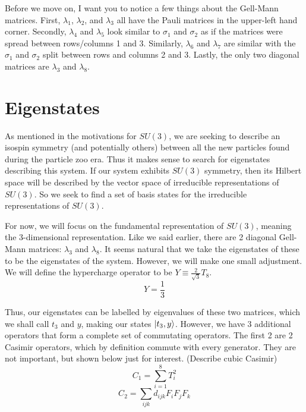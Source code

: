 \documentclass[12pt]{article}
\newcommand{\aside}[2]{#1}
\newcommand{\link}[2]{#1}
\newcommand{\todo}[1]{(#1)}
\begin{document}
Before we move on, I want you to notice a few things about the Gell-Mann matrices. First, $\lambda_1$, $\lambda_2$, and $\lambda_3$ all have the Pauli matrices in the upper-left hand corner. Secondly, $\lambda_4$ and $\lambda_5$ look similar to $\sigma_1$ and $\sigma_2$ as if the matrices were spread between rows/columns 1 and 3. Similarly, $\lambda_6$ and $\lambda_7$ are similar with the $\sigma_1$ and $\sigma_2$ split between rows and columns 2 and 3. Lastly, the only two diagonal matrices are $\lambda_3$ and $\lambda_8$. 

\section{Eigenstates}
As mentioned in the \link{motivations for $SU(3)$}{Link}, we are seeking to describe an isospin symmetry (and potentially others) between all the new particles found during the particle zoo era. Thus it makes sense to search for eigenstates describing this system. If our system exhibits $SU(3)$ symmetry, then its Hilbert space will be described by the vector space of irreducible representations of $SU(3)$. So we seek to find a set of basis states for the irreducible representations of $SU(3)$.

For now, we will focus on the fundamental representation of $SU(3)$, meaning the \aside{3-dimensional representation}{Somewhat confusingly, $SU(3)$, while being a group of 3x3 matrices, can have representations that are described by matrices larger than 3x3. This is similar to how the $SU(2)$ group describing particle spin can have 2 dimensions (spin-\frac{1}{2}), 3-dimensions (spin-1), etc.}. Like we said earlier, there are 2 diagonal Gell-Mann matrices: $\lambda_3$ and $\lambda_8$. It seems natural that we take the eigenstates of these to be the eigenstates of the system. However, we will make one small adjustment. We will define the hypercharge operator to be $Y\equiv\frac{2}{\sqrt{3}}T_8$.
\begin{equation}
Y=\frac{1}{3}
\end{equation}

Thus, our eigenstates can be labelled by eigenvalues of these two matrices, which we shall call $t_3$ and $y$, making our states $\ket{t_3,y}$. However, we have 3 additional operators that form a complete set of commutating operators. The first 2 are 2 Casimir operators, which by definition commute with every generator. They are not important, but shown below just for interest. \todo{Describe cubic Casimir}
\begin{equation}
    C_1=\sum_{i=1}^8 T_i^2
\end{equation}
\begin{equation}
    C_2=\sum_{ijk}d_{ijk}F_i F_j F_k
\end{equation}
\end{document}
